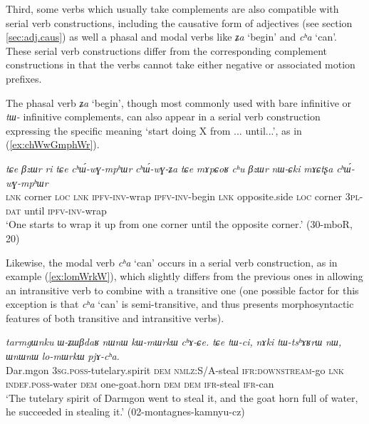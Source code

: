 \documentclass[oneside,a4paper,11pt]{article}
\newcommand{\ipa}[1]{\textit{\phon#1}}
\newcommand{\jpg}[2]{\ipa{#1} `#2'}
\newcommand{\refb}[1]{(\ref{#1})}
\begin{document}

Third, some verbs which usually take complements are also compatible with serial verb constructions, including the causative form of adjectives (see section \ref{sec:adj.caus}) as well a phasal and modal verbs like \jpg{ʑa}{begin} and  \jpg{cʰa}{can}. These serial verb constructions differ from the corresponding complement constructions in that the verbs cannot take either negative or associated motion prefixes.

The phasal verb \jpg{ʑa}{begin}, though most commonly used with bare infinitive or \ipa{tɯ-} infinitive complements, can also appear in a serial verb construction expressing the specific meaning `start doing X from ... until...', as in (\ref{ex:chWwGmphWr}).

\begin{exe}
\ex \label{ex:chWwGmphWr}
\gll  \ipa{tɕe} 	\ipa{βzɯr} 	\ipa{ri} 	\ipa{tɕe} 	\ipa{cʰɯ́-wɣ-mpʰɯr} 	\ipa{cʰɯ́-wɣ-ʑa} 	\ipa{tɕe} 	\ipa{mɤpɕoʁ} 	\ipa{cʰu} 	\ipa{βzɯr} 	\ipa{nɯ-ɕki} 	\ipa{mɤɕtʂa} 	\ipa{cʰɯ́-wɣ-mpʰɯr}  \\
\textsc{lnk} corner \textsc{loc} \textsc{lnk} \textsc{ipfv-inv-}wrap \textsc{ipfv-inv-}begin \textsc{lnk}  opposite.side \textsc{loc} corner \textsc{3pl-dat} until \textsc{ipfv-inv-}wrap  \\
\glt `One starts to wrap it up from one corner until the opposite corner.' (30-mboR, 20)
\end{exe}
 
 Likewise, the modal verb \jpg{cʰa}{can} occurs in a serial verb construction, as in example \refb{ex:lomWrkW}, which slightly differs from the previous ones in allowing an intransitive  verb to combine with a transitive one (one possible factor for this exception is that \jpg{cʰa}{can} is semi-transitive, and thus presents morphosyntactic features of both transitive and intransitive verbs).

\begin{exe}
\ex \label{ex:lomWrkW}
\gll 
\ipa{tarmgɯnku} 	\ipa{ɯ-ʑɯβdaʁ} 	\ipa{nɯnɯ} 	\ipa{kɯ-mɯrkɯ} 	\ipa{cʰɤ-ɕe.} 	\ipa{tɕe} 	\ipa{tɯ-ci,} 	\ipa{nɤki} 	\ipa{tɯ-tsʰɤʁrɯ} 	\ipa{nɯ,} 	\ipa{ɯnɯnɯ} 	\ipa{lo-mɯrkɯ} 	\ipa{pjɤ-cʰa.} \\
Dar.mgon \textsc{3sg.poss}-tutelary.spirit \textsc{dem} \textsc{nmlz}:S/A-steal \textsc{ifr:downstream}-go \textsc{lnk} \textsc{indef.poss}-water \textsc{dem} one-goat.horn \textsc{dem} \textsc{dem} \textsc{ifr}-steal \textsc{ifr}-can \\
\glt `The tutelary spirit of Darmgon went to steal it, and the goat horn full of water, he succeeded in stealing it.' (02-montagnes-kamnyu-cz)
\end{exe}
\end{document}
